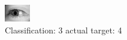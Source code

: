 \begin{figure}[h!]
\begin{center}
\includegraphics[width=0.60\columnwidth]{figures/ID3133_class_3_target_4.png}
\end{center}
\caption{ Classification: 3 actual target: 4}
\label{fig:ID3133_class_3_target_4}
\end{figure}
